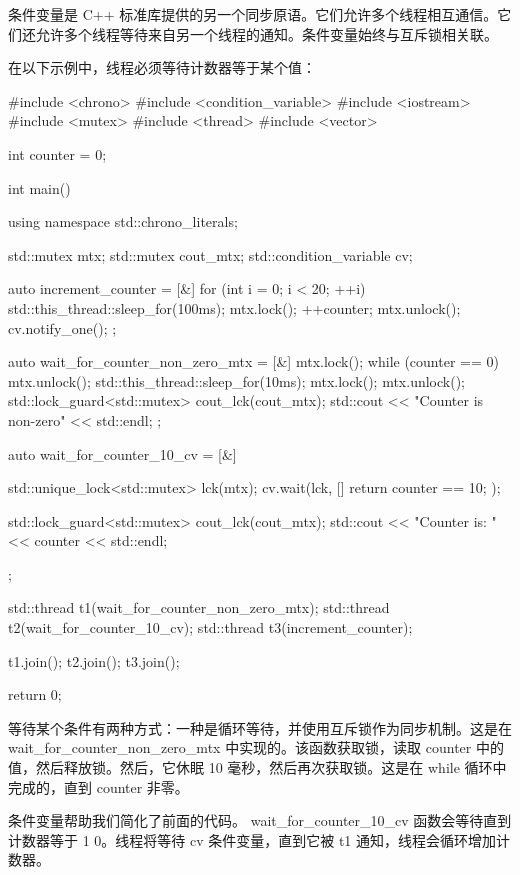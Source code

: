 条件变量是 C++ 标准库提供的另一个同步原语。它们允许多个线程相互通信。它们还允许多个线程等待来自另一个线程的通知。条件变量始终与互斥锁相关联。

在以下示例中，线程必须等待计数器等于某个值：

\begin{cpp}
#include <chrono>
#include <condition_variable>
#include <iostream>
#include <mutex>
#include <thread>
#include <vector>

int counter = 0;

int main() {
    using namespace std::chrono_literals;

    std::mutex mtx;
    std::mutex cout_mtx;
    std::condition_variable cv;

    auto increment_counter = [&] {
        for (int i = 0; i < 20; ++i) {
            std::this_thread::sleep_for(100ms);
            mtx.lock();
            ++counter;
            mtx.unlock();
            cv.notify_one();
        }
    };

    auto wait_for_counter_non_zero_mtx = [&] {
        mtx.lock();
        while (counter == 0) {
            mtx.unlock();
            std::this_thread::sleep_for(10ms);
            mtx.lock();
        }
        mtx.unlock();
        std::lock_guard<std::mutex> cout_lck(cout_mtx);
        std::cout << "Counter is non-zero" << std::endl;
    };

    auto wait_for_counter_10_cv = [&] {
        std::unique_lock<std::mutex> lck(mtx);
        cv.wait(lck, [] { return counter == 10; });

        std::lock_guard<std::mutex> cout_lck(cout_mtx);
        std::cout << "Counter is: " << counter << std::endl;
    };

    std::thread t1(wait_for_counter_non_zero_mtx);
    std::thread t2(wait_for_counter_10_cv);
    std::thread t3(increment_counter);

    t1.join();
    t2.join();
    t3.join();

    return 0;
}
\end{cpp}

等待某个条件有两种方式：一种是循环等待，并使用互斥锁作为同步机制。这是在 wait\_for\_counter\_non\_zero\_mtx 中实现的。该函数获取锁，读取 counter 中的值，然后释放锁。然后，它休眠 10 毫秒，然后再次获取锁。这是在 while 循环中完成的，直到 counter 非零。

条件变量帮助我们简化了前面的代码。 wait\_for\_counter\_10\_cv 函数会等待直到计数器等于 1 0。线程将等待 cv 条件变量，直到它被 t1 通知，线程会循环增加计数器。

